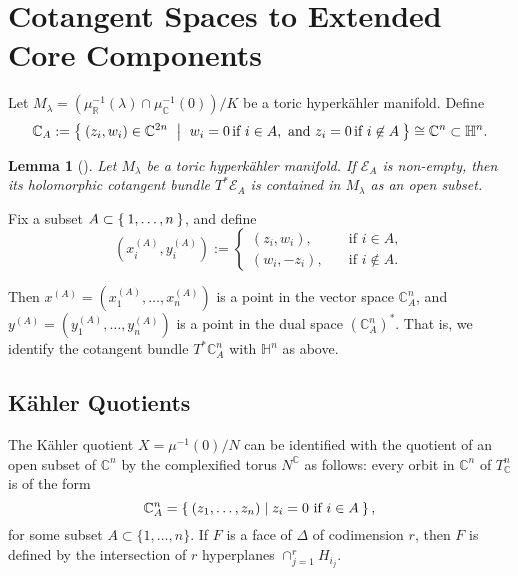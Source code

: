 \documentclass{article}
\newtheorem{lemma}[theorem]{Lemma}
\newcommand{\hyperkahler}{hyperk\"ahler }
\newcommand{\RR}{\mathbb{R}}
\newcommand{\CC}{\mathbb{C}}
\newcommand{\HH}{\mathbb{H}}
\newcommand{\mcE}{\mathcal{E}}
\newcommand{\pbrackets}[1]{\left( #1 \right)}
\begin{document}
	
	
	
	
	
	
	
	

	\section{Cotangent Spaces to Extended Core Components}
	
	Let $M_{\lambda} = \pbrackets{\mu_{\RR}^{-1}(\lambda) \cap \mu_{\CC}^{-1}(0)}/K$ be a toric \hyperkahler manifold. Define
	\begin{equation*}
		\CC_{A} := \Set{ (z_{i}, w_{i}) \in \CC^{2n}\ | \ w_{i} = 0\, \text{if } i \in A, \text{ and } z_{i} = 0\, \text{if } i \not\in A } \cong \CC^{n} \subset \HH^{n}.
	\end{equation*}
	
	\begin{lemma}[\cite{Konno2002}]\label{cotangent:1}
		Let $M_{\lambda}$ be a toric \hyperkahler manifold. If $\mcE_{A}$ is non-empty, then its holomorphic cotangent bundle $T^{\ast}\mcE_{A}$ is contained in $M_{\lambda}$ as an open subset.
	\end{lemma}
	
	Fix a subset $A \subset \Set{1, \ldots, n}$, and define
	\begin{equation*}
		(x_{i}^{(A)}, y_{i}^{(A)}) :=
		\begin{cases}
			(z_{i}, w_{i}), \quad &\text{if } i \in A, \\
			(w_{i}, -z_{i}), \quad &\text{if } i \not\in A.
		\end{cases}
	\end{equation*}

	Then $x^{(A)} = (x_{1}^{(A)}, \ldots, x_{n}^{(A)})$ is a point in the vector space $\CC_{A}^{n}$, and $y^{(A)} = (y_{1}^{(A)}, \ldots, y_{n}^{(A)})$ is a point in the dual space $\pbrackets{\CC_{A}^{n}}^{\ast}$. That is, we identify the cotangent bundle $T^{\ast}\CC_{A}^{n}$ with $\HH^{n}$ as above.
	
	\subsection{K{\"a}hler Quotients}
	
	The K{\"a}hler quotient $X = \mu^{-1}(0) / N$ can be identified with the quotient of an open subset of $\CC^{n}$ by the complexified torus $N^{\CC}$ as follows: every orbit in $\CC^{n}$ of $T_{\CC}^{n}$ is of the form
	\[
		\CC_{A}^{n} = \Set{ (z_{1}, \ldots, z_{n}) | z_{i} = 0 \text{ if } i \in A},
	\]
	for some subset $A \subset \{1,\ldots, n\}$. If $F$ is a face of $\Delta$ of codimension $r$, then $F$ is defined by the intersection of $r$ hyperplanes $\cap_{j = 1}^{r}H_{i_{j}}$. 
	
\end{document}
